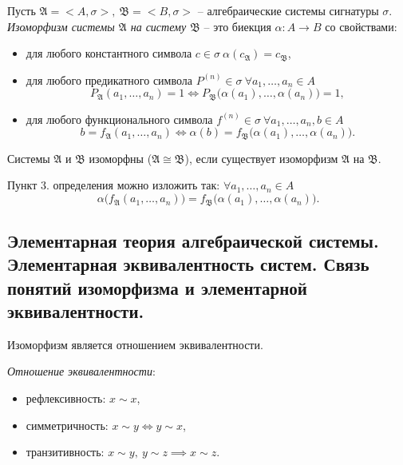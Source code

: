 \begin{definition}
    Пусть $ \mathfrak{A} = <A,\sigma>, \ \mathfrak{B} = <B,\sigma> $ -- алгебраические системы сигнатуры $ \sigma $. \emph{Изоморфизм системы $ \mathfrak{A} $ на систему $ \mathfrak{B} $} -- это биекция $ \alpha: A \rightarrow B $ со свойствами:
    \begin{itemize}
        \item для любого константного символа $ c \in \sigma \ \alpha(c_\mathfrak{A}) = c_\mathfrak{B} $,
        \item для любого предикатного символа $ P^{(n)}\in\sigma \ \forall a_1,\ldots,a_n \in A $
              \[
                  P_\mathfrak{A}(a_1,\ldots,a_n) = 1 \iff P_\mathfrak{B}\big(\alpha(a_1),\ldots,\alpha(a_n)\big) = 1,
              \]
        \item для любого функционального символа $ f^{(n)} \in \sigma \ \forall a_1,\ldots,a_n,b \in A $
              \[
                  b = f_\mathfrak{A}(a_1,\ldots,a_n) \iff \alpha(b) = f_\mathfrak{B}\big(\alpha(a_1),\ldots,\alpha(a_n)\big).
              \]
    \end{itemize}

    Системы $ \mathfrak{A} $ и $ \mathfrak{B} $ изоморфны ($ \mathfrak{A} \cong \mathfrak{B} $), если существует изоморфизм $ \mathfrak{A} $ на $ \mathfrak{B} $.
\end{definition}

\begin{remark}
    Пункт 3. определения можно изложить так: $ \forall a_1,\ldots,a_n \in A $
    \[
        \alpha\big(f_\mathfrak{A}(a_1,\ldots,a_n)\big) = f_\mathfrak{B}\big(\alpha(a_1),\ldots,\alpha(a_n)\big).
    \]
\end{remark}

\subsection{Элементарная теория алгебраической системы. Элементарная эквивалентность систем. Связь понятий изоморфизма и элементарной эквивалентности.}

\begin{note}
    Изоморфизм является отношением эквивалентности.

    \emph{Отношение эквивалентности}:
    \begin{itemize}
        \item рефлексивность: $ x \sim x $,
        \item симметричность: $ x \sim y \iff y \sim x $,
        \item транзитивность: $ x \sim y, \ y \sim z \implies x \sim z $.
    \end{itemize}
\end{note}


